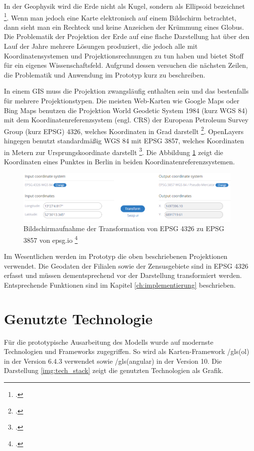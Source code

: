 In der Geophysik wird die Erde nicht als Kugel, sondern als Ellipsoid bezeichnet \footcite{jung_figur_1956}.
Wenn man jedoch eine Karte elektronisch auf einem Bildschirm betrachtet, dann sieht man ein Rechteck und keine Anzeichen der Krümmung eines Globus.
Die Problematik der Projektion der Erde auf eine flache Darstellung hat über den Lauf der Jahre mehrere Lösungen produziert, die jedoch alle mit Koordinatensystemen und Projektionsrechnungen zu tun haben und bietet Stoff für ein eigenes Wissenschaftsfeld.
Aufgrund dessen versuchen die nächsten Zeilen, die Problematik und Anwendung im Prototyp kurz zu beschreiben.

In einem GIS muss die Projektion zwangsläufig enthalten sein und das bestenfalls für mehrere Projektionstypen.
Die meisten Web-Karten wie Google Maps oder Bing Maps benutzen die Projektion World Geodetic System 1984 (kurz WGS 84) mit dem Koordinatenreferenzsystem (engl. CRS) der European Petroleum Survey Group (kurz EPSG) 4326, welches Koordinaten in Grad darstellt \footcite{epsg.io_4326}.
OpenLayers hingegen benutzt standardmäßig WGS 84 mit EPSG 3857, welches Koordinaten in Metern zur Ursprungskoordinate darstellt \footcite{epsg.io_3857}.
Die Abbildung \ref{img:epsg.io} zeigt die Koordinaten eines Punktes in Berlin in beiden Koordinatenreferenzsystemen.

\begin{figure}[H]
	\centering
	\includegraphics[scale=0.6]{resources/images/projection_epsg.png}
	\caption{Bildschirmaufnahme der Transformation  von EPSG 4326 zu EPSG 3857 von epsg.io \footcite{epsg.io_transform}}
	\label{img:epsg.io}
\end{figure}

Im Wesentlichen werden im Prototyp die oben beschriebenen Projektionen verwendet.
Die Geodaten der Filialen sowie der Zensusgebiete sind in EPSG 4326 erfasst und müssen dementsprechend vor der Darstellung transformiert werden.
Entsprechende Funktionen sind im Kapitel \ref{ch:implementierung} \glqqImplementierung\glqq beschrieben.

\section{Genutzte Technologie}
Für die prototypische Ausarbeitung des Modells wurde auf modernste Technologien und Frameworks zugegriffen. So wird als Karten-Framework /gls(ol) in der Version 6.4.3 verwendet sowie /gls(angular) in der Version 10.
Die Darstellung \ref{img:tech_stack} zeigt die genutzten Technologien als Grafik.


